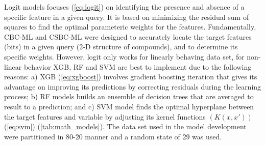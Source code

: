 \FloatBarrier %

Logit models focuses (\ref{eq:logit}) on identifying the presence and absence of a specific feature in a given query. It is based on minimizing the residual sum of squares to find the optimal parameteric weights for the features. Fundamentally, CBC-ML and CSBC-ML were designed to accurately locate the target features (bits) in a given query (2-D structure of compounds), and to determine its specific weights. However, logit only works for linearly behaving data set, for non-linear behavior XGB, RF and SVM are best to implement due to the following reasons: a) XGB (\ref{eq:xgboost}) involves gradient boosting iteration that gives its advantage on improving its predictions by correcting residuals during the learning process; b) RF models builds an ensemble of decision trees that are averaged to result to a prediction; and c) SVM model finds the optimal hyperplane between the target features and variable by adjusting its kernel functions $(K(x,x'))$(\ref{eq:svm}) (\autoref{tab:math_models}). The data set used in the model development were partitioned in 80-20 manner and a random state of 29 was used.



